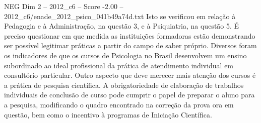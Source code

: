 \begin{textsample}{NEG Dim 2 – 2012\_c6 – Score -2.00 – 2012\_c6/enade\_2012\_psico\_041b49a74d.txt}
Isto se verificou em relação à Pedagogia e à Administração, na questão 3, e à Psiquiatria, na questão 5.
É preciso questionar em que medida as instituições formadoras estão demonstrando ser possível legitimar práticas a partir do campo de saber próprio.
Diversos foram os indicadores de que os cursos de Psicologia no Brasil desenvolvem um ensino subordinado ao ideal profissional da prática de atendimento individual em consultório particular.
Outro aspecto que deve merecer mais atenção dos cursos é a prática de pesquisa científica.
A obrigatoriedade de elaboração de trabalhos individuais de conclusão de curso pode cumprir o papel de preparar o aluno para a pesquisa, modificando o quadro encontrado na correção da prova ora em questão, bem como o incentivo à programas de Iniciação Científica.

\end{textsample}

